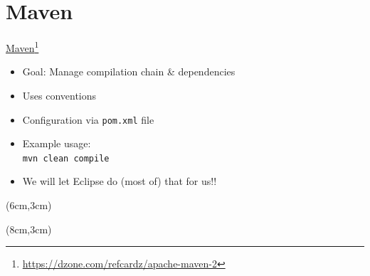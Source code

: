 \documentclass[English,c,%
hyperref={%
    pdftitle={FISA-DE2 OOP in Java},%
    pdfauthor={Muller, Gravier, Laforest, Subercaze},%
    pdfsubject={OOP in Java},%
    pdfkeywords={OOP, Java},%
    colorlinks=true,%
    urlcolor=blue,%
    linkcolor=%
    },%
xcolor={pdftex,svgnames} %
]{beamer}
\begin{document}
\section*{Maven}
\begin{frame}[fragile]{\href{https://maven.apache.org/}{\color{white} Maven}\footnote{\url{https://dzone.com/refcardz/apache-maven-2}}}
  \begin{itemize}
    \item<1-> Goal: Manage compilation chain \& dependencies
    \bigskip
    \item<2-> Uses conventions\\
    \bigskip
    \item<5-> Configuration via \texttt{pom.xml} file
    \bigskip
    \item<6-> Example usage:\\
    \texttt{mvn clean compile}
    \bigskip
    \item<7-> We will let Eclipse do (most of) that for us!!
  \end{itemize}

  \begin{textblock*}{0.4\linewidth}(6cm,3cm)%
  \end{textblock*}
  \begin{textblock*}{0.4\linewidth}(8cm,3cm)%
  \end{textblock*}

\end{frame}
\end{document}

